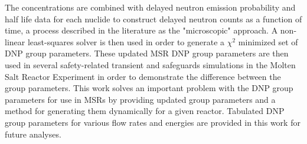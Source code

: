 The concentrations are combined with delayed neutron emission probability and half life data for each nuclide to construct delayed neutron counts as a function of time, a process described in the literature as the "microscopic" approach.
A non-linear least-squares solver is then used in order to generate a $\chi^2$ minimized set of DNP group parameters.
These updated MSR DNP group parameters are then used in several safety-related transient and safeguards simulations in the Molten Salt Reactor Experiment in order to demonstrate the difference between the group parameters.
This work solves an important problem with the DNP group parameters for use in MSRs by providing updated group parameters and a method for generating them dynamically for a given reactor.
Tabulated DNP group parameters for various flow rates and energies are provided in this work for future analyses.
